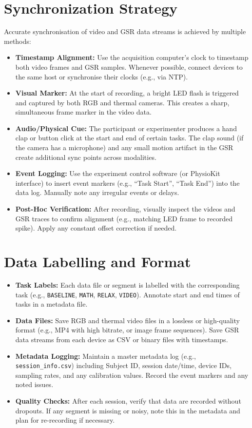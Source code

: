 \documentclass{article}
\begin{document}
\section{Synchronization Strategy}
Accurate synchronisation of video and GSR data streams is achieved by multiple methods:
\begin{itemize}
    \item \textbf{Timestamp Alignment:} Use the acquisition computer’s clock to timestamp both video frames and GSR samples. Whenever possible, connect devices to the same host or synchronise their clocks (e.g., via NTP).
    \item \textbf{Visual Marker:} At the start of recording, a bright LED flash is triggered and captured by both RGB and thermal cameras. This creates a sharp, simultaneous frame marker in the video data.
    \item \textbf{Audio/Physical Cue:} The participant or experimenter produces a hand clap or button click at the start and end of certain tasks. The clap sound (if the camera has a microphone) and any small motion artifact in the GSR create additional sync points across modalities.
    \item \textbf{Event Logging:} Use the experiment control software (or PhysioKit interface) to insert event markers (e.g., “Task Start”, “Task End”) into the data log. Manually note any irregular events or delays.
    \item \textbf{Post-Hoc Verification:} After recording, visually inspect the videos and GSR traces to confirm alignment (e.g., matching LED frame to recorded spike). Apply any constant offset correction if needed.
\end{itemize}


\section{Data Labelling and Format}
\begin{itemize}
    \item \textbf{Task Labels:} Each data file or segment is labelled with the corresponding task (e.g., \texttt{BASELINE}, \texttt{MATH}, \texttt{RELAX}, \texttt{VIDEO}). Annotate start and end times of tasks in a metadata file.
    \item \textbf{Data Files:} Save RGB and thermal video files in a lossless or high-quality format (e.g., MP4 with high bitrate, or image frame sequences). Save GSR data streams from each device as CSV or binary files with timestamps.
    \item \textbf{Metadata Logging:} Maintain a master metadata log (e.g., \texttt{session\_info.csv}) including Subject ID, session date/time, device IDs, sampling rates, and any calibration values. Record the event markers and any noted issues.
    \item \textbf{Quality Checks:} After each session, verify that data are recorded without dropouts. If any segment is missing or noisy, note this in the metadata and plan for re-recording if necessary.
\end{itemize}
\end{document}
